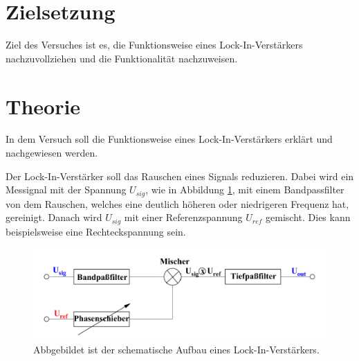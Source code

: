 \section{Zielsetzung}
Ziel des Versuches ist es, die Funktionsweise eines Lock-In-Verstärkers nachzuvollziehen und die Funktionalität nachzuweisen.


\section{Theorie \cite{V303}}
\label{Zielsetzung}
In dem Versuch soll die Funktionsweise eines Lock-In-Verstärkers erklärt und nachgewiesen werden.

\label{sec:Theorie}

Der Lock-In-Verstärker soll das Rauschen eines Signals reduzieren.
Dabei wird ein Messignal mit der Spannung $U_{sig}$, wie in Abbildung \ref{fig:schema}, mit einem Bandpassfilter von dem Rauschen, welches eine deutlich höheren oder niedrigeren Frequenz hat, gereinigt.
Danach wird $U_{sig}$ mit einer Referenzspannung $U_{ref}$ gemischt.
Dies kann beispielsweise eine Rechteckspannung sein.


\begin{figure}[H]
    \caption{Abbgebildet ist der schematische Aufbau eines Lock-In-Verstärkers. \cite{v303}}
    \label{fig:schema}
    \includegraphics{Bilder/schema.png}
\end{figure}

